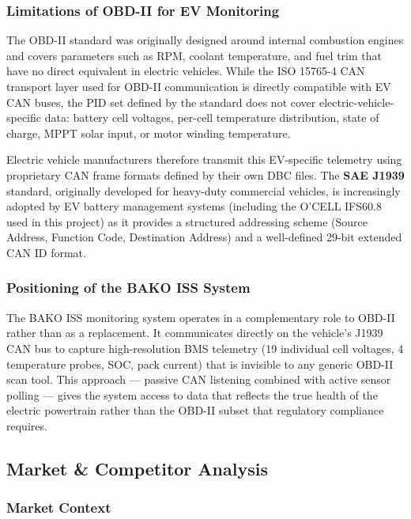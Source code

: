 \subsubsection*{Limitations of OBD-II for EV Monitoring}

The OBD-II standard was originally designed around internal combustion engines and covers parameters such as RPM, coolant temperature, and fuel trim that have no direct equivalent in electric vehicles. While the ISO 15765-4 CAN transport layer used for OBD-II communication is directly compatible with EV CAN buses, the PID set defined by the standard does not cover electric-vehicle-specific data: battery cell voltages, per-cell temperature distribution, state of charge, MPPT solar input, or motor winding temperature.

Electric vehicle manufacturers therefore transmit this EV-specific telemetry using proprietary CAN frame formats defined by their own DBC files. The \textbf{SAE J1939} standard, originally developed for heavy-duty commercial vehicles, is increasingly adopted by EV battery management systems (including the O'CELL IFS60.8 used in this project) as it provides a structured addressing scheme (Source Address, Function Code, Destination Address) and a well-defined 29-bit extended CAN ID format.

\subsubsection*{Positioning of the BAKO ISS System}

The BAKO ISS monitoring system operates in a complementary role to OBD-II rather than as a replacement. It communicates directly on the vehicle's J1939 CAN bus to capture high-resolution BMS telemetry (19 individual cell voltages, 4 temperature probes, SOC, pack current) that is invisible to any generic OBD-II scan tool. This approach --- passive CAN listening combined with active sensor polling --- gives the system access to data that reflects the true health of the electric powertrain rather than the OBD-II subset that regulatory compliance requires.

\subsection{Market \& Competitor Analysis}

\subsubsection*{Market Context}


